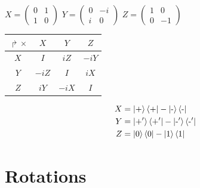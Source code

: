 \documentclass[a4paper,10pt]{scrartcl}
\begin{document}
\begin{center}


$
X = 
\begin{pmatrix}
0 & 1 \\ 
1 & 0 
\end{pmatrix}
$
\hspace{0.1\linewidth}
$
Y = 
\begin{pmatrix}
0 & -i \\ 
i & 0 
\end{pmatrix}
$
\hspace{0.1\linewidth}
$
Z = 
\begin{pmatrix}
1 & 0 \\ 
0 & -1 
\end{pmatrix}
$
\end{center}
\vspace{2\baselineskip}
\begin{minipage}{\linewidth}
\begin{minipage}{0.5\linewidth}\center

\begin{tabular}{c|c|c|c|}
\cline{2-4}
$\Rsh\times$                  & $X$   & $Y$   & $Z$   \\ \hline
\multicolumn{1}{|c|}{$X$} & $I$   & $iZ$  & $-iY$ \\ \hline
\multicolumn{1}{|c|}{$Y$} & $-iZ$ & $I$   & $iX$  \\ \hline
\multicolumn{1}{|c|}{$Z$} & $iY$  & $-iX$ & $I$   \\ \hline
\end{tabular}

\end{minipage}
\begin{minipage}{0.5\linewidth}
\begin{equation*}
\begin{split}
X &= \ket{\text{+}}\bra{+} - \ket{\text{-}}\bra{\text{-}}\\
Y &= \ket{\text{+}'}\bra{\text{+}'} - \ket{\text{-}'}\bra{\text{-}'}\\
Z &= \ket{0}\bra{0} - \ket{1}\bra{1}\\
\end{split}
\end{equation*}
\end{minipage}
\end{minipage}

\section*{Rotations}
\end{document}
